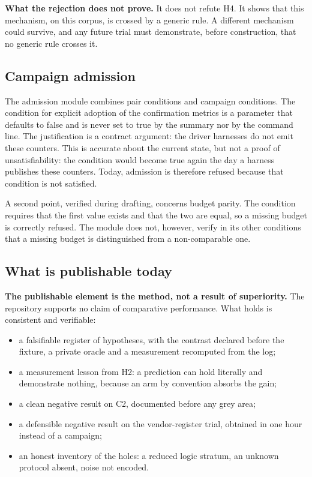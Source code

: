 \textbf{What the rejection does not prove.} It does not refute H4. It shows that
this mechanism, on this corpus, is crossed by a generic rule. A different mechanism
could survive, and any future trial must demonstrate, before construction, that no
generic rule crosses it.

\subsection{Campaign admission}

The admission module combines pair conditions and campaign conditions. The
condition for explicit adoption of the confirmation metrics is a parameter that
defaults to false and is never set to true by the summary nor by the command line.
The justification is a contract argument: the driver harnesses do not emit these
counters. This is accurate about the current state, but not a proof of
unsatisfiability: the condition would become true again the day a harness publishes
these counters. Today, admission is therefore refused because that condition is not
satisfied.

A second point, verified during drafting, concerns budget parity. The condition
requires that the first value exists and that the two are equal, so a missing budget
is correctly refused. The module does not, however, verify in its other conditions
that a missing budget is distinguished from a non-comparable one.

\subsection{What is publishable today}

\textbf{The publishable element is the method, not a result of superiority.} The
repository supports no claim of comparative performance. What holds is consistent
and verifiable:

\begin{itemize}
\item a falsifiable register of hypotheses, with the contrast declared before the
fixture, a private oracle and a measurement recomputed from the log;
\item a measurement lesson from H2: a prediction can hold literally and demonstrate
nothing, because an arm by convention absorbs the gain;
\item a clean negative result on C2, documented before any grey area;
\item a defensible negative result on the vendor-register trial, obtained in one
hour instead of a campaign;
\item an honest inventory of the holes: a reduced logic stratum, an unknown protocol
absent, noise not encoded.
\end{itemize}

